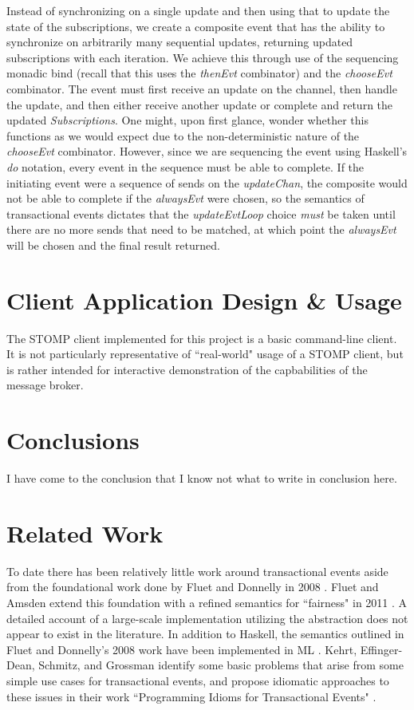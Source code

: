 \documentclass[conference, letterpaper]{IEEEtran}
\begin{document}
Instead of synchronizing on a single update and then using that to update the state of the subscriptions, we create a composite event that has the ability to synchronize on arbitrarily many sequential updates, returning updated subscriptions with each iteration. We achieve this through use of the sequencing monadic bind (recall that this uses the \textit{thenEvt} combinator) and the \textit{chooseEvt} combinator. The event must first receive an update on the channel, then handle the update, and then either receive another update or complete and return the updated \textit{Subscriptions}. One might, upon first glance, wonder whether this functions as we would expect due to the non-deterministic nature of the \textit{chooseEvt} combinator. However, since we are sequencing the event using Haskell's \textit{do} notation, every event in the sequence must be able to complete. If the initiating event were a sequence of sends on the \textit{updateChan}, the composite would not be able to complete if the \textit{alwaysEvt} were chosen, so the semantics of transactional events dictates that the \textit{updateEvtLoop} choice \textit{must} be taken until there are no more sends that need to be matched, at which point the \textit{alwaysEvt} will be chosen and the final result returned.

\section{Client Application Design \& Usage}

The STOMP client implemented for this project is a basic command-line client. It is not particularly representative of ``real-world" usage of a STOMP client, but is rather intended for interactive demonstration of the capbabilities of the message broker.

\section{Conclusions}

I have come to the conclusion that I know not what to write in conclusion here. 

\section{Related Work}
To date there has been relatively little work around transactional events aside from the foundational work done by
Fluet and Donnelly in 2008 \cite{te:original}. Fluet and Amsden extend this foundation with a refined semantics  for ``fairness" in 2011 \cite{te:fairness}.
A detailed account of a large-scale implementation utilizing the abstraction does not appear to exist in the literature. 
In addition to Haskell, the semantics outlined in Fluet and Donnelly's 2008 work have been implemented in ML \cite{te:ml}. 
Kehrt, Effinger-Dean, Schmitz, and Grossman identify some basic problems that arise from some simple use cases for
transactional events, and propose idiomatic approaches to these issues in their work ``Programming Idioms for Transactional Events" \cite{te:idioms}.  



\end{document}
